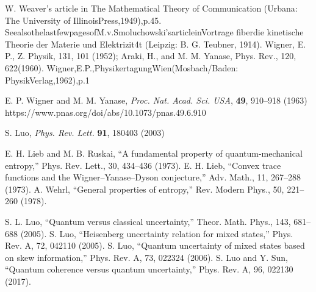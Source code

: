 \begin{thebibliography}{}
 W. Weaver's article in The Mathematical Theory of Communication (Urbana: The University of IllinoisPress,1949),p.45. SeealsothelastfewpagesofM.v.Smoluchowski'sarticleinVortrage fiberdie kinetische Theorie der Materie und Elektrizit4t (Leipzig: B. G. Teubner, 1914).
 Wigner, E. P., Z. Physik, 131, 101 (1952); Araki, H., and M. M. Yanase, Phys. Rev., 120, 622(1960).
 Wigner,E.P.,PhysikertagungWien(Mosbach/Baden: PhysikVerlag,1962),p.1

 E. P. Wigner and M. M. Yanase, \textit{Proc. Nat. Acad. Sci. USA}, \textbf{49}, 910–918 (1963) https://www.pnas.org/doi/abs/10.1073/pnas.49.6.910

 S. Luo, \textit{Phys. Rev. Lett.} \textbf{91}, 180403 (2003)

 E. H. Lieb and M. B. Ruskai, “A fundamental property of quantum-mechanical entropy,” Phys. Rev. Lett., 30, 434–436 (1973).
 E. H. Lieb, “Convex trace functions and the Wigner–Yanase–Dyson conjecture,” Adv. Math., 11, 267–288 (1973).
 A. Wehrl, “General properties of entropy,” Rev. Modern Phys., 50, 221–260 (1978).

 S. L. Luo, “Quantum versus classical uncertainty,” Theor. Math. Phys., 143, 681–688 (2005).
 S. Luo, “Heisenberg uncertainty relation for mixed states,” Phys. Rev. A, 72, 042110 (2005).
 S. Luo, “Quantum uncertainty of mixed states based on skew information,” Phys. Rev. A, 73, 022324 (2006).
 S. Luo and Y. Sun, “Quantum coherence versus quantum uncertainty,” Phys. Rev. A, 96, 022130 (2017).


\end{thebibliography}

